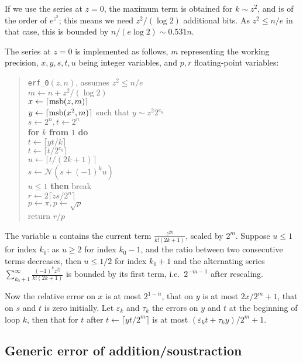 \documentclass[12pt]{amsart}
\def\q{\hspace*{5mm}}
\begin{document}
\medskip

If we use the series at $z=0$, the maximum term is obtained for
$k \sim z^2$, and is of the order of $e^{z^2}$; this means
we need $z^2/(\log 2)$ additional bits. As $z^2 \le n/e$ in that case,
this is bounded by $n/(e \log 2) \sim 0.531 n$.


The series at $z=0$ is implemented as follows, 
$m$ representing the working precision,
$x, y, s, t, u$ being integer variables, and $p, r$ floating-point
variables:
\begin{quote}
\verb|erf_0|$(z, n)$, assumes $z^2 \le n/e$ \\
$m \leftarrow n + z^2/(\log 2)$ \\
$x \leftarrow \lceil {\rm msb}(z, m) \rceil$ \\
$y \leftarrow \lceil {\rm msb}(x^2,m) \rceil$ such that $y \sim z^2 2^{e_y}$ \\
$s \leftarrow 2^n, t \leftarrow 2^n$ \\
{\bf for} $k$ {\bf from} $1$ {\bf do} \\
\q $t \leftarrow \lceil y t/k \rceil$ \\
\q $t \leftarrow \lceil t/2^{e_y} \rceil$ \\
\q $u \leftarrow \lceil t/(2k+1) \rceil$ \\
\q $s \leftarrow {\mathcal N}(s + (-1)^k u)$ \\
\q {\bf if} $u \le 1$ {\bf then} break \\
$r \leftarrow 2 \lceil z s/2^n \rceil$ \\
$p \leftarrow \pi, p \leftarrow \sqrt{p}$ \\
return $r/p$
\end{quote}
The variable $u$ contains the current term $\frac{z^{2k}}{k! (2k+1)}$,
scaled by $2^m$. Suppose $u \le 1$ for index $k_0$:
as $u \ge 2$ for index $k_0-1$, and the 
ratio between two consecutive terms decreases, then $u \le 1/2$ for index 
$k_0+1$ and the alternating series $\sum_{k_0+1}^{\infty} \frac{(-1)^k
z^{2j}}{k! (2k+1)}$
is bounded by its first term, i.e.~$2^{-m-1}$ after rescaling.

Now the relative error on $x$ is at most $2^{1-n}$,
that on $y$ is at most $2x/2^m + 1$,
that on $s$ and $t$ is zero initially.
Let $\varepsilon_k$ and $\tau_k$ the errors on $y$ and $t$
at the beginning of loop $k$,
then that for $t$ after $t \leftarrow \lceil y t/2^m \rceil$
is at most $(\varepsilon_k t + \tau_k y)/2^m + 1$.

\subsection{Generic error of addition/soustraction}\label{generic:sous}
\end{document}
